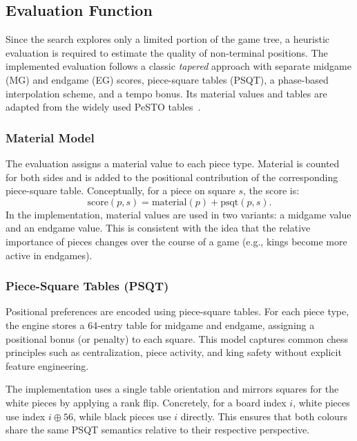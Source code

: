 \subsection{Evaluation Function}
\label{sec:evaluation_function}

Since the search explores only a limited portion of the game tree, a heuristic
evaluation is required to estimate the quality of non-terminal positions. The
implemented evaluation follows a classic \emph{tapered} approach with separate
midgame (MG) and endgame (EG) scores, piece-square tables (PSQT), a phase-based
interpolation scheme, and a tempo bonus. Its material values and tables are
adapted from the widely used PeSTO tables~\cite{cpw_pesto}.

\subsubsection{Material Model}
\label{subsec:material_model}

The evaluation assigns a material value to each piece type. Material is counted
for both sides and is added to the positional contribution of the corresponding
piece-square table. Conceptually, for a piece on square $s$, the score is:
\[
\text{score}(p,s) = \text{material}(p) + \text{psqt}(p,s).
\]
In the implementation, material values are used in two variants: a midgame value
and an endgame value. This is consistent with the idea that the relative
importance of pieces changes over the course of a game (e.g., kings become more
active in endgames).

\subsubsection{Piece-Square Tables (PSQT)}
\label{subsec:psqt}

Positional preferences are encoded using piece-square tables. For each piece
type, the engine stores a 64-entry table for midgame and endgame, assigning a
positional bonus (or penalty) to each square. This model captures common chess
principles such as centralization, piece activity, and king safety without
explicit feature engineering.

The implementation uses a single table orientation and mirrors squares for the
white pieces by applying a rank flip. Concretely, for a board index $i$,
white pieces use index $i \oplus 56$, while black pieces use $i$ directly. This
ensures that both colours share the same PSQT semantics relative to their
respective perspective.

